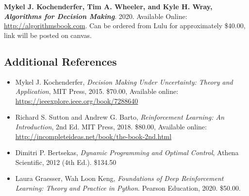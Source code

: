 \documentclass[9pt]{article}
\begin{document}
\textbf{Mykel J. Kochenderfer, Tim A. Wheeler, and Kyle H. Wray, \textit{Algorithms for Decision Making}}. 2020. Available Online: \url{http://algorithmsbook.com}. Can be ordered from Lulu for approximately \$40.00, link will be posted on canvas.

\subsection*{Additional References}

\begin{itemize}[noitemsep]
    \item Mykel J. Kochenderfer, \textit{Decision Making Under Uncertainty: Theory and Application}, MIT Press, 2015. \$70.00, Available online: \url{https://ieeexplore.ieee.org/book/7288640}
    \item Richard S. Sutton and Andrew G. Barto, \textit{Reinforcement Learning: An Introduction}, 2nd Ed. MIT Press, 2018. \$80.00, Available online: \url{http://incompleteideas.net/book/the-book-2nd.html}
    \item Dimitri P. Bertsekas, \textit{Dynamic Programming and Optimal Control}, Athena Scientific, 2012 (4th Ed.). \$134.50
    \item Laura Graesser, Wah Loon Keng, \textit{Foundations of Deep Reinforcement Learning: Theory and Practice in Python}. Pearson Education, 2020. \$50.00.
\end{itemize}
\end{document}
